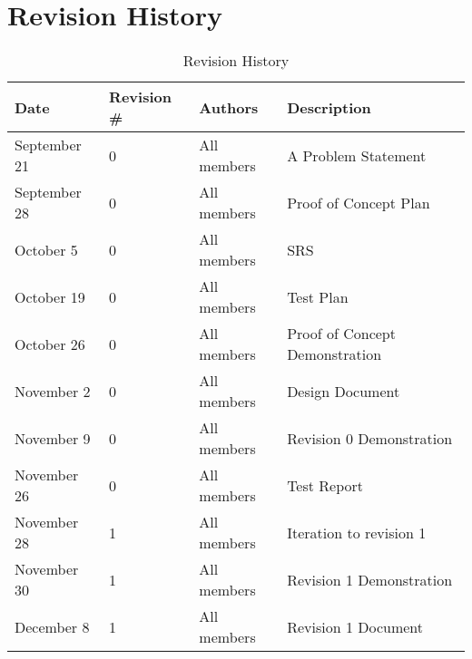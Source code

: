 \documentclass[12pt]{article}
\begin{document}
\section{Revision History}
\begin{table}[H]
\centering
      \caption{Revision History}
        \label{tab:table2}
      \begin{tabular}{ | p{4cm} | p{2cm} | p{4cm} | p{4cm}  | }
        \hline
            \textbf{Date} & \textbf{Revision \#} & \textbf{Authors} & \textbf{Description} \\
        \hline
          September 21 & 0 & All members & A Problem Statement  \\
        \hline
          September 28 & 0 & All members & Proof of Concept Plan \\
        \hline
          October 5 & 0 & All members & SRS \\
        \hline
          October 19 & 0 & All members & Test Plan \\
        \hline
          October 26 & 0 & All members & Proof of Concept Demonstration \\
        \hline
          November 2 & 0 & All members & Design Document \\
        \hline
          November 9 & 0 & All members & Revision 0 Demonstration \\
        \hline
          November 26 & 0 & All members & Test Report \\
        \hline
          November 28 & 1 & All members & Iteration to revision 1 \\
        \hline
          November 30 & 1 & All members & Revision 1 Demonstration \\
        \hline
          December 8 & 1 & All members & Revision 1 Document \\
       \hline
      \end{tabular}
  \end{table}
\end{document}

